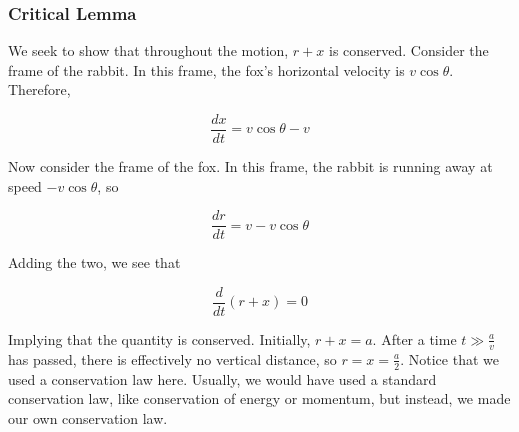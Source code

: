 \documentclass[11pt]{scrartcl}
\begin{document}
\subsubsection{Critical Lemma}

We seek to show that throughout the motion, $r+x$ is conserved.
Consider the frame of the rabbit.
In this frame, the fox's horizontal velocity is $ v \cos{\theta}$.
Therefore,

$$\frac{dx}{dt} = v \cos{\theta} - v$$

Now consider the frame of the fox.
In this frame, the rabbit is running away at speed $- v \cos{\theta}$, so

$$ \frac{dr}{dt} = v - v \cos{\theta} $$

Adding the two, we see that

$$\frac{d}{dt} \left (r+x \right) = 0$$

Implying that the quantity is conserved.
Initially, $r+x = a$. After a time $t \gg \frac{a}{v}$ has passed, there is effectively no vertical distance, so $r = x = \frac{a}{2}$.
Notice that we used a conservation law here. Usually, we would have used a standard conservation law, like conservation of energy or momentum, but instead, we made our own conservation law.
\end{document}
